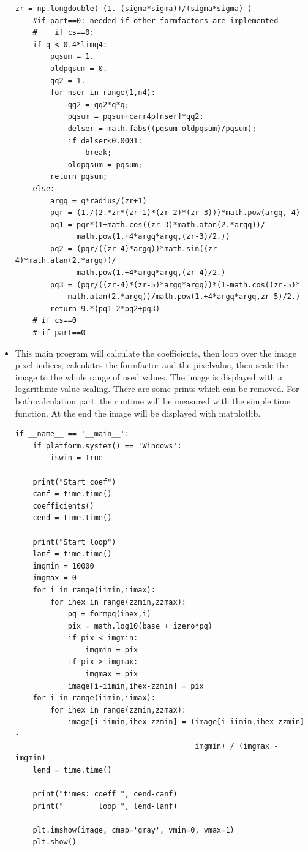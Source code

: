 \documentclass[11pt]{article} %
\begin{document}
\begin{itemize}
\begin{lstlisting}[frame=single]
    zr = np.longdouble( (1.-(sigma*sigma))/(sigma*sigma) )
    #if part==0: needed if other formfactors are implemented
    #    if cs==0:
    if q < 0.4*limq4:
        pqsum = 1.
        oldpqsum = 0.
        qq2 = 1.
        for nser in range(1,n4):
            qq2 = qq2*q*q;
            pqsum = pqsum+carr4p[nser]*qq2;
            delser = math.fabs((pqsum-oldpqsum)/pqsum);
            if delser<0.0001:
                break;
            oldpqsum = pqsum;
        return pqsum;
    else:
        argq = q*radius/(zr+1)
        pqr = (1./(2.*zr*(zr-1)*(zr-2)*(zr-3)))*math.pow(argq,-4)
        pq1 = pqr*(1+math.cos((zr-3)*math.atan(2.*argq))/
              math.pow(1.+4*argq*argq,(zr-3)/2.))
        pq2 = (pqr/((zr-4)*argq))*math.sin((zr-4)*math.atan(2.*argq))/
              math.pow(1.+4*argq*argq,(zr-4)/2.)
        pq3 = (pqr/((zr-4)*(zr-5)*argq*argq))*(1-math.cos((zr-5)*
            math.atan(2.*argq))/math.pow(1.+4*argq*argq,zr-5)/2.)
        return 9.*(pq1-2*pq2+pq3)
    # if cs==0
    # if part==0
\end{lstlisting}

\item This main program will calculate the coefficients, then loop over the image pixel indices, calculates the formfactor and the pixelvalue, then scale the image to the whole range of used values. The image is displayed with a logarithmic value scaling. There are some prints which can be removed. For both calculation part, the runtime will be measured with the simple time function. At the end the image will be displayed with matplotlib.
\begin{lstlisting}[frame=single]
if __name__ == '__main__':
    if platform.system() == 'Windows':
        iswin = True

    print("Start coef")
    canf = time.time()
    coefficients()
    cend = time.time()

    print("Start loop")
    lanf = time.time()
    imgmin = 10000
    imgmax = 0
    for i in range(iimin,iimax):
        for ihex in range(zzmin,zzmax):
            pq = formpq(ihex,i)
            pix = math.log10(base + izero*pq)
            if pix < imgmin:
                imgmin = pix
            if pix > imgmax:
                imgmax = pix
            image[i-iimin,ihex-zzmin] = pix
    for i in range(iimin,iimax):
        for ihex in range(zzmin,zzmax):
            image[i-iimin,ihex-zzmin] = (image[i-iimin,ihex-zzmin] -
                                         imgmin) / (imgmax - imgmin)
    lend = time.time()
    
    print("times: coeff ", cend-canf)
    print("        loop ", lend-lanf)
    
    plt.imshow(image, cmap='gray', vmin=0, vmax=1)
    plt.show()
\end{lstlisting}

\end{itemize}
\end{document}
